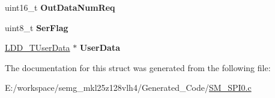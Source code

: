 \begin{DoxyCompactItemize}
\item 
\hypertarget{struct_s_m___s_p_i0___t_device_data_ad56f7895031e3d2411b64de901a541c9}{uint16\-\_\-t {\bfseries Out\-Data\-Num\-Req}}\label{struct_s_m___s_p_i0___t_device_data_ad56f7895031e3d2411b64de901a541c9}

\item 
\hypertarget{struct_s_m___s_p_i0___t_device_data_a6d690dee313e8a4e898523218d1ef3c5}{uint8\-\_\-t {\bfseries Ser\-Flag}}\label{struct_s_m___s_p_i0___t_device_data_a6d690dee313e8a4e898523218d1ef3c5}

\item 
\hypertarget{struct_s_m___s_p_i0___t_device_data_ac24e74711fbd825ae3ba35d940ad8243}{\hyperlink{group___p_e___types__module_ga0b66a73f87238a782318aa0be7578e35}{L\-D\-D\-\_\-\-T\-User\-Data} $\ast$ {\bfseries User\-Data}}\label{struct_s_m___s_p_i0___t_device_data_ac24e74711fbd825ae3ba35d940ad8243}

\end{DoxyCompactItemize}


The documentation for this struct was generated from the following file\-:\begin{DoxyCompactItemize}
\item 
E\-:/workspace/semg\-\_\-mkl25z128vlh4/\-Generated\-\_\-\-Code/\hyperlink{_s_m___s_p_i0_8c}{S\-M\-\_\-\-S\-P\-I0.\-c}\end{DoxyCompactItemize}
